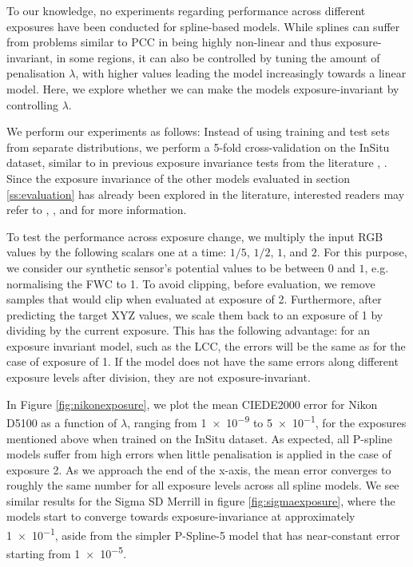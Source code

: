 To our knowledge, no experiments regarding performance across different exposures have been conducted for spline-based models. While splines can suffer from problems similar to PCC in being highly non-linear and thus exposure-invariant, in some regions, it can also be controlled by tuning the amount of penalisation $\lambda$, with higher values leading the model increasingly towards a linear model. Here, we explore whether we can make the models exposure-invariant by controlling $\lambda$.

We perform our experiments as follows: Instead of using training and test sets from separate distributions, we perform a 5-fold cross-validation on the InSitu dataset, similar to in previous exposure invariance tests from the literature \cite{kucuk2022exposure}, \cite{finlayson2015color}.
Since the exposure invariance of the other models evaluated in section \ref{ss:evaluation} has already been explored in the literature, interested readers may refer to \cite{finlayson2015color}, \cite{kucuk2022comparison}, \cite{kucuk2022exposure} and \cite{kucuk2023performance} for more information.

To test the performance across exposure change, we multiply the input RGB values by the following scalars one at a time: $1/5$, $1/2$, $1$, and $2$. For this purpose, we consider our synthetic sensor's potential values to be between $0$ and $1$, e.g. normalising the FWC to 1. To avoid clipping, before evaluation, we remove samples that would clip when evaluated at exposure of 2. Furthermore, after predicting the target XYZ values, we scale them back to an exposure of 1 by dividing by the current exposure. This has the following advantage: for an exposure invariant model, such as the LCC, the errors will be the same as for the case of exposure of 1. If the model does not have the same errors along different exposure levels after division, they are not exposure-invariant.

In Figure \ref{fig:nikonexposure}, we plot the mean CIEDE2000 error for Nikon D5100 as a function of $\lambda$, ranging from \num{1e-9} to \num{5e-1}, for the exposures mentioned above when trained on the InSitu dataset. As expected, all P-spline models suffer from high errors when little penalisation is applied in the case of exposure 2. As we approach the end of the x-axis, the mean error converges to roughly the same number for all exposure levels across all spline models. We see similar results for the Sigma SD Merrill in figure \ref{fig:sigmaexposure}, where the models start to converge towards exposure-invariance at approximately \num{1e-1}, aside from the simpler P-Spline-5 model that has near-constant error starting from \num{1e-5}.

